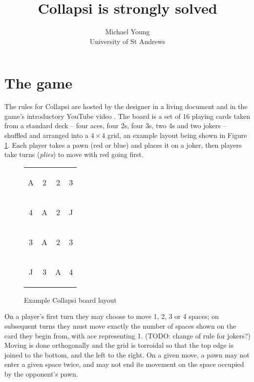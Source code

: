 \documentclass[a4paper, twocolumn]{article}
\title{Collapsi is strongly solved}
\author{Michael Young\\University of St Andrews}
\newcommand\card[1]{\begin{tcolorbox}#1\end{tcolorbox}}
\begin{document}
\maketitle



\section{The game}

The rules for Collapsi are hosted by the designer in a living document
\cite{rules} and in the game's introductory YouTube video \cite{youtube}. The
board is a set of 16 playing cards taken from a standard deck -- four aces, four
2s, four 3s, two 4s and two jokers -- shuffled and arranged into a $4\times 4$
grid, an example layout being shown in Figure \ref{fig:board}. Each player takes
a pawn (red or blue) and places it on a joker, then players take turns
(\textit{plies}) to move with red going first.

\begin{figure}[h]
  \centering
  \begin{tabular}{c c c c}
    \card{A} & \card{2} & \card{2} & \card{3} \\
    \card{4} & \card{A} & \card{2} & \card{J} \\
    \card{3} & \card{A} & \card{2} & \card{3} \\
    \card{J} & \card{3} & \card{A} & \card{4}
  \end{tabular}

  \caption{Example Collapsi board layout}
  \label{fig:board}
\end{figure}

On a player's first turn they may choose to move 1, 2, 3 or 4 spaces; on
subsequent turns they must move exactly the number of spaces shown on the card
they begin from, with ace representing 1.  (TODO: change of rule for jokers?)
Moving is done orthogonally and the grid is torroidal so that the top edge is
joined to the bottom, and the left to the right. On a given move, a pawn may not
enter a given space twice, and may not end its movement on the space occupied by
the opponent's pawn.
\end{document}
